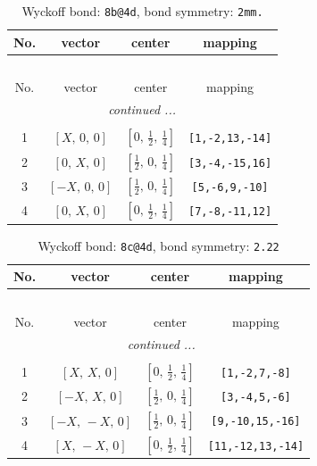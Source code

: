 \documentclass[fleqn,8pt]{jsarticle}
\begin{document}
\renewcommand{\arraystretch}{1.2}
\begin{longtable}{cccc}
\caption{Wyckoff bond: {\tt 8b@4d}, bond symmetry: {\tt 2mm.}}
 \\
 \hline \hline
No. & vector & center & mapping \\ \hline \endfirsthead

\multicolumn{3}{l}{\tablename\ \thetable{}} \\
 \hline \hline
No. & vector & center & mapping \\ \hline \endhead

 \hline \hline
\multicolumn{3}{r}{\footnotesize\it continued ...} \\ \endfoot

 \hline \hline
\multicolumn{3}{r}{} \\ \endlastfoot

1 & $\left[ X,\, 0,\, 0 \right]$ & $\left[ 0,\, \frac{1}{2},\, \frac{1}{4} \right]$ & {\tt [1,-2,13,-14]} \\ \hline
2 & $\left[ 0,\, X,\, 0 \right]$ & $\left[ \frac{1}{2},\, 0,\, \frac{1}{4} \right]$ & {\tt [3,-4,-15,16]} \\ \hline
3 & $\left[ - X,\, 0,\, 0 \right]$ & $\left[ \frac{1}{2},\, 0,\, \frac{1}{4} \right]$ & {\tt [5,-6,9,-10]} \\ \hline
4 & $\left[ 0,\, X,\, 0 \right]$ & $\left[ 0,\, \frac{1}{2},\, \frac{1}{4} \right]$ & {\tt [7,-8,-11,12]} \\
\end{longtable}
\renewcommand{\arraystretch}{1.2}
\begin{longtable}{cccc}
\caption{Wyckoff bond: {\tt 8c@4d}, bond symmetry: {\tt 2.22}}
 \\
 \hline \hline
No. & vector & center & mapping \\ \hline \endfirsthead

\multicolumn{3}{l}{\tablename\ \thetable{}} \\
 \hline \hline
No. & vector & center & mapping \\ \hline \endhead

 \hline \hline
\multicolumn{3}{r}{\footnotesize\it continued ...} \\ \endfoot

 \hline \hline
\multicolumn{3}{r}{} \\ \endlastfoot

1 & $\left[ X,\, X,\, 0 \right]$ & $\left[ 0,\, \frac{1}{2},\, \frac{1}{4} \right]$ & {\tt [1,-2,7,-8]} \\ \hline
2 & $\left[ - X,\, X,\, 0 \right]$ & $\left[ \frac{1}{2},\, 0,\, \frac{1}{4} \right]$ & {\tt [3,-4,5,-6]} \\ \hline
3 & $\left[ - X,\, - X,\, 0 \right]$ & $\left[ \frac{1}{2},\, 0,\, \frac{1}{4} \right]$ & {\tt [9,-10,15,-16]} \\ \hline
4 & $\left[ X,\, - X,\, 0 \right]$ & $\left[ 0,\, \frac{1}{2},\, \frac{1}{4} \right]$ & {\tt [11,-12,13,-14]} \\
\end{longtable}
\end{document}
